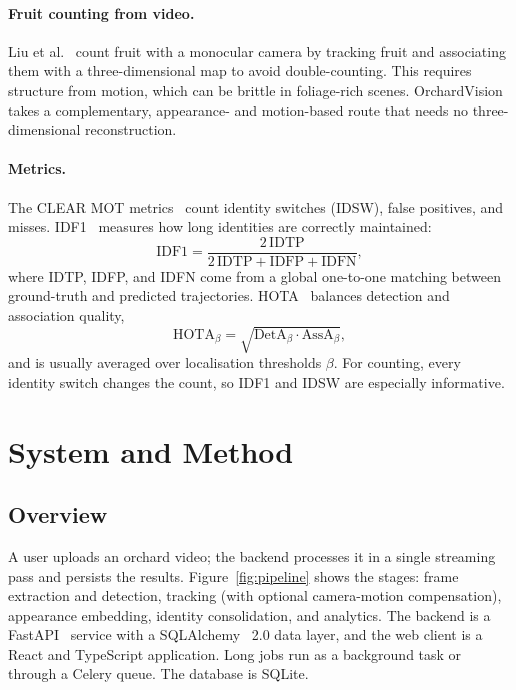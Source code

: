 \documentclass[11pt]{article}
\begin{document}
\paragraph{Fruit counting from video.} Liu et al.~\cite{liu2019} count fruit with a monocular camera by tracking fruit and associating them with a three-dimensional map to avoid double-counting. This requires structure from motion, which can be brittle in foliage-rich scenes. OrchardVision takes a complementary, appearance- and motion-based route that needs no three-dimensional reconstruction.

\paragraph{Metrics.} The CLEAR MOT metrics~\cite{bernardin2008} count identity switches (IDSW), false positives, and misses. IDF1~\cite{ristani2016} measures how long identities are correctly maintained:
\begin{equation}
\mathrm{IDF1} = \frac{2\,\mathrm{IDTP}}{2\,\mathrm{IDTP} + \mathrm{IDFP} + \mathrm{IDFN}},
\label{eq:idf1}
\end{equation}
where IDTP, IDFP, and IDFN come from a global one-to-one matching between ground-truth and predicted trajectories. HOTA~\cite{luiten2021} balances detection and association quality,
\begin{equation}
\mathrm{HOTA}_{\beta} = \sqrt{\mathrm{DetA}_{\beta}\cdot \mathrm{AssA}_{\beta}},
\label{eq:hota}
\end{equation}
and is usually averaged over localisation thresholds $\beta$. For counting, every identity switch changes the count, so IDF1 and IDSW are especially informative.

\section{System and Method}
\label{sec:method}

\subsection{Overview}

A user uploads an orchard video; the backend processes it in a single streaming pass and persists the results. Figure~\ref{fig:pipeline} shows the stages: frame extraction and detection, tracking (with optional camera-motion compensation), appearance embedding, identity consolidation, and analytics. The backend is a FastAPI~\cite{fastapi} service with a SQLAlchemy~\cite{sqlalchemy} 2.0 data layer, and the web client is a React and TypeScript application. Long jobs run as a background task or through a Celery queue. The database is SQLite.
\end{document}
